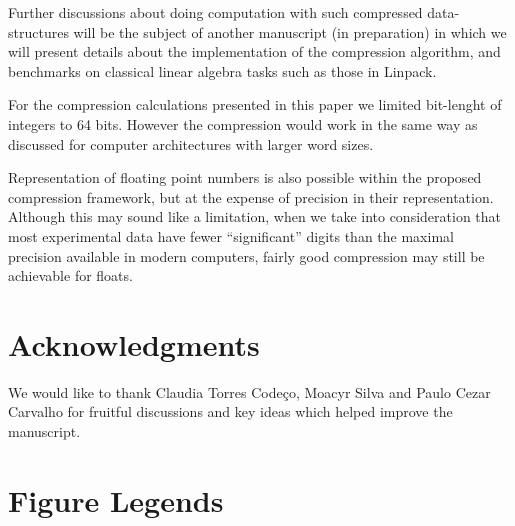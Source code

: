 \documentclass[10pt]{article}
\begin{document}
Further discussions about doing computation with such compressed data-structures
will be the subject of another manuscript (in preparation) in which we will
present details about the implementation of the compression algorithm, and
benchmarks on classical linear algebra tasks such as those in
Linpack\cite{dongarra1979linpack}.

For the compression calculations presented in this paper we limited bit-lenght of integers to 64 bits. However the compression would work in the same way as discussed for computer architectures with larger word sizes.

Representation of floating point numbers is also possible within the proposed compression framework, but at the expense of precision in their representation. Although this may sound like a limitation, when we take into consideration that most experimental data have fewer ``significant'' digits than the maximal precision available in modern computers, fairly good compression may still be achievable for floats.



\section*{Acknowledgments}
We would like to thank Claudia Torres Code\c{c}o, Moacyr Silva and Paulo
Cezar Carvalho for fruitful discussions and key ideas which helped improve the
manuscript.



\section*{Figure Legends}
\end{document}
